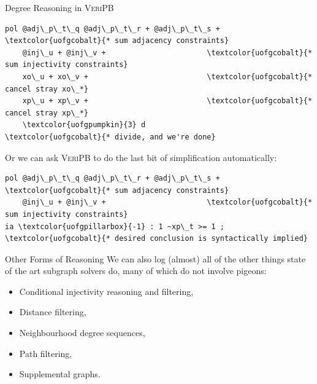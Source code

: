 \documentclass[aspectratio=169,compress,10pt]{beamer}
\makeatletter
\newcommand{\proofsystemformat}[1]{\textsc{#1}\@}
\newcommand{\veripb}{\proofsystemformat{VeriPB}\xspace}
\makeatother
\begin{document}
\begin{frame}[fragile]{Degree Reasoning in \veripb}
\begin{Verbatim}[commandchars=\\\{\},codes={\catcode`$=3\catcode`^=7\catcode`_=8}]
pol @adj\_p\_t\_q @adj\_p\_t\_r + @adj\_p\_t\_s +    \textcolor{uofgcobalt}{* sum adjacency constraints}
    @inj\_u + @inj\_v +                       \textcolor{uofgcobalt}{* sum injectivity constraints}
    xo\_u + xo\_v +                           \textcolor{uofgcobalt}{* cancel stray xo\_*}
    xp\_u + xp\_v +                           \textcolor{uofgcobalt}{* cancel stray xp\_*}
    \textcolor{uofgpumpkin}{3} d                                     \textcolor{uofgcobalt}{* divide, and we're done}
\end{Verbatim}

\medskip

Or we can ask \veripb to do the last bit of simplification automatically:

\medskip

\begin{Verbatim}[commandchars=\\\{\},codes={\catcode`$=3\catcode`^=7\catcode`_=8}]
pol @adj\_p\_t\_q @adj\_p\_t\_r + @adj\_p\_t\_s +    \textcolor{uofgcobalt}{* sum adjacency constraints}
    @inj\_u + @inj\_v +                       \textcolor{uofgcobalt}{* sum injectivity constraints}
ia \textcolor{uofgpillarbox}{-1} : 1 ~xp\_t >= 1 ;                      \textcolor{uofgcobalt}{* desired conclusion is syntactically implied}
\end{Verbatim}
\end{frame}

\begin{frame}{Other Forms of Reasoning}
    We can also log (almost) all of the other things state of the art subgraph solvers do,
    many of which do not involve pigeons:
\begin{itemize}
\item
  Conditional injectivity reasoning and filtering,
\item
  Distance filtering,
\item
  Neighbourhood degree sequences,
\item
  Path filtering,
\item
  Supplemental graphs.
\end{itemize}

\medskip

\end{frame}
\end{document}
